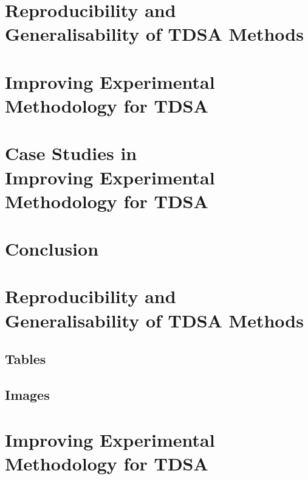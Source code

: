 \documentclass[11pt]{report}
\begin{document}
\chapter{Reproducibility and Generalisability of TDSA Methods}
\label{chapter:reproducibility}

\chapter[Improving Experimental Methodology for TDSA]{Improving Experimental\\Methodology for TDSA}
\label{chapter:methodology}

\chapter[Case Studies in Improving Experimental Methodology for TDSA]{Case Studies in\\Improving Experimental\\Methodology for TDSA}
\label{chapter:case_study_methodology}

\chapter{Conclusion}
\label{chapter:conclusion}


\appendix
\chapter{Reproducibility and Generalisability of TDSA Methods}
\section{Tables}
\label{appendix_reproducibility_tables}

\section{Images}
\label{appendix_reproducibility_images}

\chapter[Improving Experimental Methodology for TDSA]{Improving Experimental\\Methodology for TDSA}
\end{document}

